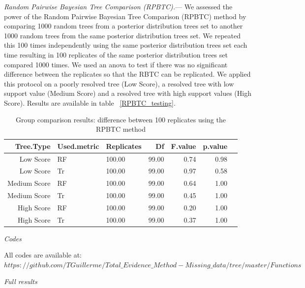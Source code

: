 \documentclass[12pt,letterpaper]{article}
\renewcommand{\subsection}[1]{%
\bigskip
\begin{center}
\begin{large}
\normalfont\itshape #1
\end{large}
\end{center}}
\renewcommand{\subsubsection}[1]{%
\vspace{2ex}
\noindent
\textit{#1.}---}
\begin{document}
\subsubsection{Random Pairwise Bayesian Tree Comparison (RPBTC)}
We assessed the power of the Random Pairwise Bayesian Tree Comparison (RPBTC) method by comparing 1000 random trees from a posterior distribution trees set to another 1000 random trees from the same posterior distribution trees set.
We repeated this 100 times independently using the same posterior distribution trees set each time resulting in 100 replicates of the same posterior distribution trees set compared 1000 times.
We used an anova to test if there was no significant difference between the replicates so that the RBTC can be replicated.
We applied this protocol on a poorly resolved tree (Low Score), a resolved tree with low support value (Medium Score) and a resolved tree with high support values (High Score).
Results are available in table ~\ref{RPBTC_testing}. %

\begin{table}[ht]
\caption{Group comparison results: difference between 100 replicates using the RPBTC method} %
\centering
\begin{tabular}{rllrrrr}
  \hline
  Tree.Type & Used.metric & Replicates & Df & F.value & p.value \\ 
  \hline
  Low Score & RF & 100.00 & 99.00 & 0.74 & 0.98 \\ 
  Low Score & Tr & 100.00 & 99.00 & 0.97 & 0.58 \\ 
  Medium Score & RF & 100.00 & 99.00 & 0.64 & 1.00 \\ 
  Medium Score & Tr & 100.00 & 99.00 & 0.45 & 1.00 \\ 
  High Score & RF & 100.00 & 99.00 & 0.20 & 1.00 \\ 
  High Score & Tr & 100.00 & 99.00 & 0.37 & 1.00 \\ 
  \hline
\end{tabular}
\end{table}
\label{RPBTC_testing}

\subsection{Codes}
All codes are available at: $https://github.com/TGuillerme/Total\_Evidence\_Method-Missing\_data/tree/master/Functions$

\subsection{Full results}
\end{document}
